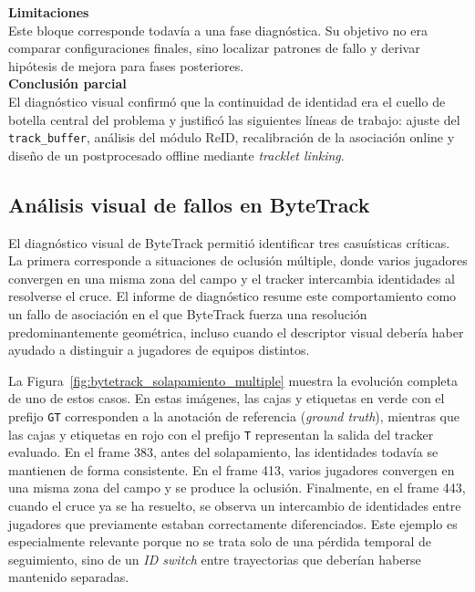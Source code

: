 \documentclass[../MAIN.tex]{subfiles}
\begin{document}
\begin{chaptertemplatebox}
		\textbf{Limitaciones}\\
		Este bloque corresponde todavía a una fase diagnóstica. Su objetivo no era comparar configuraciones finales, sino localizar patrones de fallo y derivar hipótesis de mejora para fases posteriores.\\[0.5em]
		
		\textbf{Conclusión parcial}\\
		El diagnóstico visual confirmó que la continuidad de identidad era el cuello de botella central del problema y justificó las siguientes líneas de trabajo: ajuste del \texttt{track\_buffer}, análisis del módulo ReID, recalibración de la asociación online y diseño de un postprocesado offline mediante \textit{tracklet linking}.
	\end{chaptertemplatebox}
	
	\subsection{Análisis visual de fallos en ByteTrack}
	
	El diagnóstico visual de ByteTrack permitió identificar tres casuísticas críticas. La primera corresponde a situaciones de oclusión múltiple, donde varios jugadores convergen en una misma zona del campo y el tracker intercambia identidades al resolverse el cruce. El informe de diagnóstico resume este comportamiento como un fallo de asociación en el que ByteTrack fuerza una resolución predominantemente geométrica, incluso cuando el descriptor visual debería haber ayudado a distinguir a jugadores de equipos distintos.
	
	La Figura~\ref{fig:bytetrack_solapamiento_multiple} muestra la evolución completa de uno de estos casos. En estas imágenes, las cajas y etiquetas en verde con el prefijo \texttt{GT} corresponden a la anotación de referencia (\textit{ground truth}), mientras que las cajas y etiquetas en rojo con el prefijo \texttt{T} representan la salida del tracker evaluado. En el frame 383, antes del solapamiento, las identidades todavía se mantienen de forma consistente. En el frame 413, varios jugadores convergen en una misma zona del campo y se produce la oclusión. Finalmente, en el frame 443, cuando el cruce ya se ha resuelto, se observa un intercambio de identidades entre jugadores que previamente estaban correctamente diferenciados. Este ejemplo es especialmente relevante porque no se trata solo de una pérdida temporal de seguimiento, sino de un \textit{ID switch} entre trayectorias que deberían haberse mantenido separadas.
	
\end{document}
